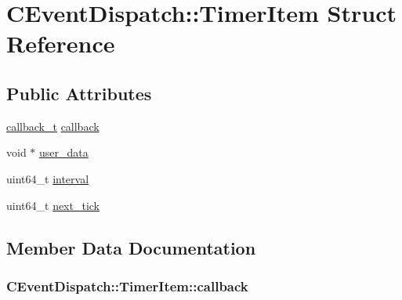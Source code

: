 \hypertarget{struct_c_event_dispatch_1_1_timer_item}{}\section{C\+Event\+Dispatch\+:\+:Timer\+Item Struct Reference}
\label{struct_c_event_dispatch_1_1_timer_item}
\subsection*{Public Attributes}
\begin{DoxyCompactItemize}
\item 
\hyperlink{msfs_2include_2common_2ostype_8h_a126e68a4e9bb7ecb6c88b2eeb66a0ee7}{callback\+\_\+t} \hyperlink{struct_c_event_dispatch_1_1_timer_item_a2c60ecf7d5d052d7ca75cb7c9001138c}{callback}
\item 
void $\ast$ \hyperlink{struct_c_event_dispatch_1_1_timer_item_a56adca3c8753438e2b469ab3d6a5354a}{user\+\_\+data}
\item 
uint64\+\_\+t \hyperlink{struct_c_event_dispatch_1_1_timer_item_ab049cb99bfd5a4927f7c39e99e121c5b}{interval}
\item 
uint64\+\_\+t \hyperlink{struct_c_event_dispatch_1_1_timer_item_acd964e96fe7a860eb05a793aecc47b08}{next\+\_\+tick}
\end{DoxyCompactItemize}


\subsection{Member Data Documentation}
\hypertarget{struct_c_event_dispatch_1_1_timer_item_a2c60ecf7d5d052d7ca75cb7c9001138c}{}
\subsubsection[{callback}]{ C\+Event\+Dispatch\+::\+Timer\+Item\+::callback}\label{struct_c_event_dispatch_1_1_timer_item_a2c60ecf7d5d052d7ca75cb7c9001138c}
\hypertarget{struct_c_event_dispatch_1_1_timer_item_ab049cb99bfd5a4927f7c39e99e121c5b}{}
